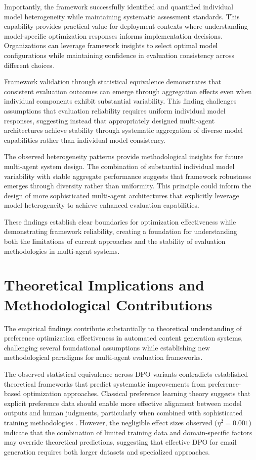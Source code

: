 Importantly, the framework successfully identified and quantified individual model heterogeneity while maintaining systematic assessment standards. This capability provides practical value for deployment contexts where understanding model-specific optimization responses informs implementation decisions. Organizations can leverage framework insights to select optimal model configurations while maintaining confidence in evaluation consistency across different choices.

Framework validation through statistical equivalence demonstrates that consistent evaluation outcomes can emerge through aggregation effects even when individual components exhibit substantial variability. This finding challenges assumptions that evaluation reliability requires uniform individual model responses, suggesting instead that appropriately designed multi-agent architectures achieve stability through systematic aggregation of diverse model capabilities rather than individual model consistency.

The observed heterogeneity patterns provide methodological insights for future multi-agent system design. The combination of substantial individual model variability with stable aggregate performance suggests that framework robustness emerges through diversity rather than uniformity. This principle could inform the design of more sophisticated multi-agent architectures that explicitly leverage model heterogeneity to achieve enhanced evaluation capabilities.

These findings establish clear boundaries for optimization effectiveness while demonstrating framework reliability, creating a foundation for understanding both the limitations of current approaches and the stability of evaluation methodologies in multi-agent systems.

\section{Theoretical Implications and Methodological Contributions}
\label{sec:theoretical-implications}

The empirical findings contribute substantially to theoretical understanding of preference optimization effectiveness in automated content generation systems, challenging several foundational assumptions while establishing new methodological paradigms for multi-agent evaluation frameworks.

The observed statistical equivalence across DPO variants contradicts established theoretical frameworks that predict systematic improvements from preference-based optimization approaches. Classical preference learning theory suggests that explicit preference data should enable more effective alignment between model outputs and human judgments, particularly when combined with sophisticated training methodologies \cite{rafailov2023dpo}. However, the negligible effect sizes observed ($\eta^2 = 0.001$) indicate that the combination of limited training data and domain-specific factors may override theoretical predictions, suggesting that effective DPO for email generation requires both larger datasets and specialized approaches.

